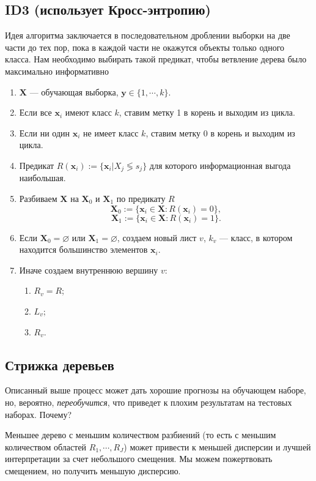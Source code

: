 \documentclass{article}
\begin{document}
\subsection{ID3 (использует Кросс-энтропию)}

Идея алгоритма заключается в последовательном дроблении выборки на две части
до тех пор, пока в каждой части не окажутся объекты только одного класса. Нам необходимо выбирать такой предикат, чтобы ветвление дерева было максимально информативно

\begin{enumerate}
	\item $\textbf{X}$ --- обучающая выборка, $\textbf{y} \in \{1, \cdots, k\}$.
	\item Если все $\textbf{x}_i$ имеют класс $k$, ставим метку 1 в корень и выходим из цикла.
	\item Если ни один $\textbf{x}_i$ не имеет класс $k$, ставим метку 0 в корень и выходим из цикла.
	\item Предикат $R(\textbf{x}_i):=\{ \textbf{x}_i | X_j \lessgtr s_j \}$ для которого информационная выгода наибольшая.
	\item Разбиваем $\textbf{X}$ на $\textbf{X}_0$ и $\textbf{X}_1$ по предикату $R$
	$$\textbf{X}_0:=\{ \textbf{x}_i \in \textbf{X}:R(\textbf{x}_i) = 0 \},$$
	$$\textbf{X}_1:=\{ \textbf{x}_i \in \textbf{X}:R(\textbf{x}_i) = 1 \}.$$
	\item Если $\textbf{X}_0 = \varnothing$ или $\textbf{X}_1 = \varnothing$, создаем новый лист $v$, $k_v$ --- класс, в котором находится большинство элементов $\textbf{x}_i.$
	\item Иначе создаем внутреннюю вершину $v$:
		\begin{enumerate}
			\item $R_v = R$;
			\item $L_v$;
			\item $R_v$.
		\end{enumerate}
\end{enumerate}

\subsection{Стрижка деревьев}

Описанный выше процесс может дать хорошие прогнозы на обучающем наборе, но, вероятно, \textit{переобучится}, что приведет к плохим результатам на тестовых наборах. Почему?

Меньшее дерево с меньшим количеством разбиений (то есть с меньшим количеством областей $R_1, \cdots, R_J$) может привести к меньшей дисперсии и лучшей интерпретации за счет небольшого смещения. Мы можем пожертвовать смещением, но получить меньшую дисперсию.
\end{document}

